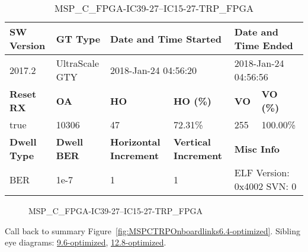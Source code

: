 \begin{table}[h]
\centering
\caption{MSP\_C\_FPGA-IC39-27--IC15-27-TRP\_FPGA}
\label{tab:MSPCFPGAIC3927IC1527TRPFPGA6.4-optimized}
\begin{tabular}{@{}|l|l|l|l|l|l|@{}}
\toprule
\textbf{SW Version}                & \textbf{GT Type}   & \multicolumn{2}{l|}{\textbf{Date and Time Started}}            & \multicolumn{2}{l|}{\textbf{Date and Time Ended}}        \\ \midrule
2017.2                       & UltraScale GTY          & \multicolumn{2}{l|}{2018-Jan-24 04:56:20}                   & \multicolumn{2}{l|}{2018-Jan-24 04:56:56}               \\ \midrule
\textbf{Reset RX}                  & \textbf{OA} & \textbf{HO}   & \textbf{HO (\%)} & \textbf{VO} & \textbf{VO (\%)} \\ \midrule
true & 10306        & 47          & 72.31\%        & 255        & 100.00\%       \\ \midrule
\textbf{Dwell Type}                & \textbf{Dwell BER} & \textbf{Horizontal Increment} & \textbf{Vertical Increment}    & \multicolumn{2}{l|}{\textbf{Misc Info}}                  \\ \midrule
BER                            & 1e-7        & 1        & 1           & \multicolumn{2}{l|}{ELF Version: 0x4002 SVN: 0}                         \\ \bottomrule
\end{tabular}
\end{table}

\begin{figure}[h]
\caption{MSP\_C\_FPGA-IC39-27--IC15-27-TRP\_FPGA} \label{fig:MSPCFPGAIC3927IC1527TRPFPGA6.4-optimized}
\end{figure}

Call back to summary Figure~\ref{fig:MSPCTRPOnboardlinks6.4-optimized}.
Sibling eye diagrams: \hyperref[sec:MSPCFPGAIC3927IC1527TRPFPGA9.6-optimized]{9.6-optimized}, \hyperref[sec:MSPCFPGAIC3927IC1527TRPFPGA12.8-optimized]{12.8-optimized}.

\clearpage
\newpage

